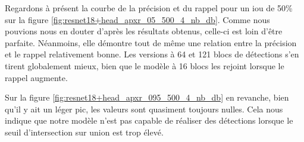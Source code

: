 \break

Regardons à présent la courbe de la précision et du rappel pour un \acrshort{iou} de 50\% sur la figure \ref{fig:resnet18+head_apxr_05_500_4_nb_db}. Comme nous pouvions nous en douter d'après les résultats obtenus, celle-ci est loin d'être parfaite. Néanmoins, elle démontre tout de même une relation entre la précision et le rappel relativement bonne. Les versions à 64 et 121 blocs de détections s'en tirent globalement mieux, bien que le modèle à 16 blocs les rejoint lorsque le rappel augmente.

Sur la figure \ref{fig:resnet18+head_apxr_095_500_4_nb_db} en revanche, bien qu'il y ait un léger pic, les valeurs sont quasiment toujours nulles. Cela nous indique que notre modèle n'est pas capable de réaliser des détections lorsque le seuil d'intersection sur union est trop élevé.

